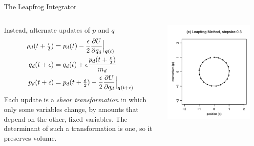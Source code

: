 \documentclass[aspectratio=169]{beamer}
\begin{document}
\begin{frame}{The Leapfrog Integrator}

\begin{columns}
\begin{column}{.66\textwidth}
Instead, alternate updates of $p$ and $q$
\begin{align}
    p_d(t+\tfrac{\epsilon}{2}) &= p_d(t) - \frac{\epsilon}{2} \frac{\partial U}{\partial q_d} \Big|_{\boldsymbol{q}(t)} \\
    q_d(t+\epsilon) &= q_d(t) + \epsilon \frac{p_d(t+\tfrac{\epsilon}{2})}{m_d} \\
    p_d(t+\epsilon) &= p_d(t + \tfrac{\epsilon}{2}) - \frac{\epsilon}{2} \frac{\partial U}{\partial q_d} \Big|_{\boldsymbol{q}(t + \epsilon)} \\
\end{align}
Each update is a \textit{shear transformation} in which only some variables change, by amounts that depend on the other, fixed variables. The determinant of such a transformation is one, so it preserves volume.
\end{column}

\begin{column}{.33\textwidth}
\centering
\includegraphics[width=\textwidth]{figures/lap3/leapfrog.pdf}
\end{column}
\end{columns}
    
\end{frame}
\end{document}
